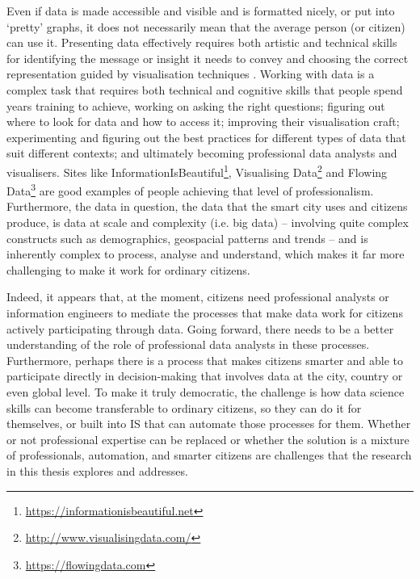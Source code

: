 Even if data is made accessible and visible and is formatted nicely, or put into `pretty' graphs, it does not necessarily mean that the average person (or citizen) can use it. Presenting data effectively requires both artistic and technical skills for identifying the message or insight it needs to convey and choosing the correct representation guided by visualisation techniques \citep{chi_taxonomy_2000}. Working with data is a complex task that requires both technical and cognitive skills that people spend years training to achieve, working on asking the right questions; figuring out where to look for data and how to access it; improving their visualisation craft; experimenting and figuring out the best practices for different types of data that suit different contexts; and ultimately becoming professional data analysts and visualisers. Sites like InformationIsBeautiful\footnote{\url{https://informationisbeautiful.net}}, Visualising Data\footnote{\url{http://www.visualisingdata.com/}} and Flowing Data\footnote{\url{https://flowingdata.com}} are good examples of people achieving that level of professionalism. Furthermore, the data in question, the data that the smart city uses and citizens produce, is data at scale and complexity (i.e. big data) -- involving quite complex constructs such as demographics, geospacial patterns and trends -- and is inherently complex to process, analyse and understand, which makes it far more challenging to make it work for ordinary citizens.
\newline

\noindent
Indeed, it appears that, at the moment, citizens need professional analysts or information engineers to mediate the processes that make data work for citizens actively participating through data. Going forward, there needs to be a better understanding of the role of professional data analysts in these processes. Furthermore, perhaps there is a process that makes citizens smarter and able to participate directly in decision-making that involves data at the city, country or even global level. To make it truly democratic, the challenge is how data science skills can become transferable to ordinary citizens, so they can do it for themselves, or built into IS that can automate those processes for them. Whether or not professional expertise can be replaced or whether the solution is a mixture of professionals, automation, and smarter citizens are challenges that the research in this thesis explores and addresses.

